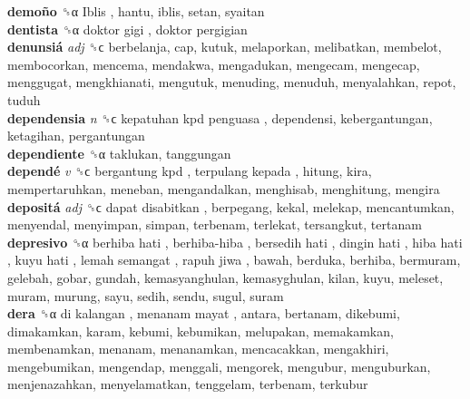 \textbf{demoño} ␝α   Iblis , hantu, iblis, setan, syaitan  \\
\textbf{dentista} ␝α   doktor gigi ,  doktor pergigian   \\
\textbf{denunsiá} \emph{adj}  ␝ϲ  berbelanja, cap, kutuk, melaporkan, melibatkan, membelot, membocorkan, mencema, mendakwa, mengadukan, mengecam, mengecap, menggugat, mengkhianati, mengutuk, menuding, menuduh, menyalahkan, repot, tuduh  \\
\textbf{dependensia} \emph{n}  ␝ϲ   kepatuhan kpd penguasa , dependensi, kebergantungan, ketagihan, pergantungan  \\
\textbf{dependiente} ␝α  taklukan, tanggungan  \\
\textbf{dependé} \emph{v}  ␝ϲ   bergantung kpd ,  terpulang kepada , hitung, kira, mempertaruhkan, meneban, mengandalkan, menghisab, menghitung, mengira  \\
\textbf{depositá} \emph{adj}  ␝ϲ   dapat disabitkan , berpegang, kekal, melekap, mencantumkan, menyendal, menyimpan, simpan, terbenam, terlekat, tersangkut, tertanam  \\
\textbf{depresivo} ␝α   berhiba hati ,  berhiba-hiba ,  bersedih hati ,  dingin hati ,  hiba hati ,  kuyu hati ,  lemah semangat ,  rapuh jiwa , bawah, berduka, berhiba, bermuram, gelebah, gobar, gundah, kemasyanghulan, kemasyghulan, kilan, kuyu, meleset, muram, murung, sayu, sedih, sendu, sugul, suram  \\
\textbf{dera} ␝α   di kalangan ,  menanam mayat , antara, bertanam, dikebumi, dimakamkan, karam, kebumi, kebumikan, melupakan, memakamkan, membenamkan, menanam, menanamkan, mencacakkan, mengakhiri, mengebumikan, mengendap, menggali, mengorek, mengubur, menguburkan, menjenazahkan, menyelamatkan, tenggelam, terbenam, terkubur  \\
